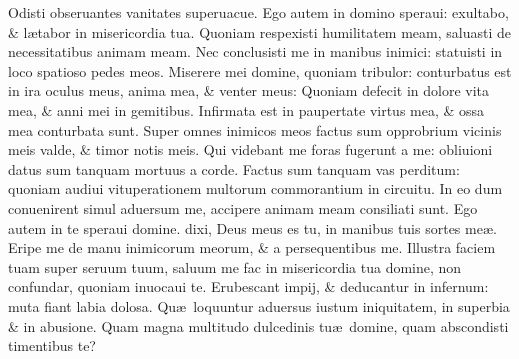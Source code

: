 \documentclass[a5paper,10pt]{book}
\def\ae{æ}
\begin{document}
\begin{multicols*}{2}
\newline \color{red} O\color{black}disti obseruantes vanitates superuacue.
\newline \color{red} E\color{black}go autem in domino speraui: exultabo, \& l\ae tabor in misericordia tua.
\newline \color{red} Q\color{black}uoniam respexisti humilitatem meam, saluasti de necessitatibus animam meam.
\newline \color{red} N\color{black}ec conclusisti me in manibus inimici: statuisti in loco spatioso pedes meos.
\newline \color{red} M\color{black}iserere mei domine, quoniam tribulor: conturbatus est in ira oculus meus, anima mea, \& venter meus:
\newline \color{red} Q\color{black}uoniam defecit in dolore vita mea, \& anni mei in gemitibus.
\newline \color{red} I\color{black}nfirmata est in paupertate virtus mea, \& ossa mea conturbata sunt.
\newline \color{red} S\color{black}uper omnes inimicos meos factus sum opprobrium vicinis meis valde, \& timor notis meis.
\newline \color{red} Q\color{black}ui videbant me foras fugerunt a me: obliuioni datus sum tanquam mortuus a corde.
\newline \color{red} F\color{black}actus sum tanquam vas perditum: quoniam audiui vituperationem multorum commorantium in circuitu.
\newline \color{red} I\color{black}n eo dum conuenirent simul aduersum me, accipere animam meam consiliati sunt.
\newline \color{red} E\color{black}go autem in te speraui domine. dixi, Deus meus es tu, in manibus tuis sortes me\ae .
\newline \color{red} E\color{black}ripe me de manu inimicorum meorum, \& a persequentibus me.
\newline \color{red} I\color{black}llustra faciem tuam super seruum tuum, saluum me fac in misericordia tua domine, non confundar, quoniam inuocaui te.
\newline \color{red} E\color{black}rubescant impij, \& deducantur in infernum: muta fiant labia dolosa.
\newline \color{red} Q\color{black}u\ae \ loquuntur aduersus iustum iniquitatem, in superbia \& in abusione.
\newline \color{red} Q\color{black}uam magna multitudo dulcedinis tu\ae \ domine, quam abscondisti timentibus te?

\end{multicols*}
\end{document}
